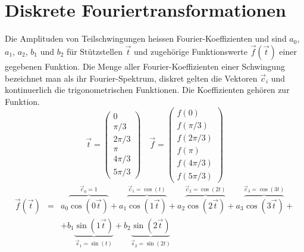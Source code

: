\section{Diskrete Fouriertransformationen}
Die Amplituden von Teilschwingungen heissen Fourier-Koeffizienten und sind $a_0$, $a_1$, $a_2$, $b_1$ und $b_2$ für Stützstellen $\overrightarrow{t}$ und zugehörige Funktionswerte $\overrightarrow{f}\left(\overrightarrow{t}\right)$ einer gegebenen Funktion. Die Menge aller Fourier-Koeffizienten einer Schwingung bezeichnet man als ihr Fourier-Spektrum, diskret gelten die Vektoren $\overrightarrow{c}_i$ und kontinuerlich die trigonometrischen Funktionen. Die Koeffizienten gehören zur Funktion.
\begin{equation}
\boxed{\overrightarrow{t}=\begin{pmatrix}0\\\pi/3\\2\pi/3\\\pi\\4\pi/3\\5\pi/3\end{pmatrix}\quad \overrightarrow{f}=\begin{pmatrix}f\left(0\right)\\f\left(\pi/3\right)\\f\left(2\pi/3\right)\\f\left(\pi\right)\\f\left(4\pi/3\right)\\f\left(5\pi/3\right)\end{pmatrix}}
\end{equation}
\begin{equation}
\boxed{
\begin{array}{lll}\overrightarrow{f}\left(\overrightarrow{t}\right)&=&a_0\overbrace{\cos\left(0\overrightarrow{t}\right)}^{\overrightarrow{c}_0=1}+a_1\overbrace{\cos\left(1\overrightarrow{t}\right)}^{\overrightarrow{c}_1=\cos\left(t\right)}+a_2\overbrace{\cos\left(2\overrightarrow{t}\right)}^{\overrightarrow{c}_2=\cos\left(2t\right)}+a_3\overbrace{\cos\left(3\overrightarrow{t}\right)}^{\overrightarrow{c}_3=\cos\left(3t\right)}+\\
&&+b_1\underbrace{\sin\left(1\overrightarrow{t}\right)}_{\overrightarrow{s}_1=\sin\left(t\right)}+b_2\underbrace{\sin\left(2\overrightarrow{t}\right)}_{\overrightarrow{s}_2=\sin\left(2t\right)}
\end{array}}
\end{equation}

